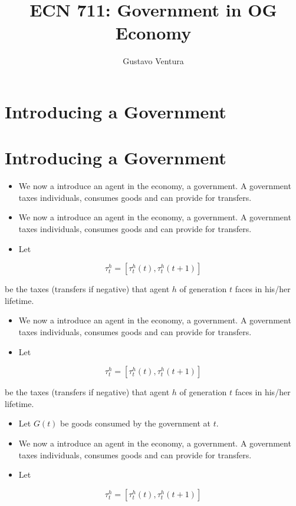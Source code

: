 \documentclass[10pt]{article}
\title{ECN 711: Government in OG Economy }
\author{Gustavo Ventura}
\date{}
\begin{document}
\maketitle


\section*{Introducing a Government}
\section*{Introducing a Government}
\begin{itemize}
  \item We now a introduce an agent in the economy, a government. A government taxes individuals, consumes goods and can provide for transfers.
  \item We now a introduce an agent in the economy, a government. A government taxes individuals, consumes goods and can provide for transfers.
  \item Let
\end{itemize}

$$
\tau_{t}^{h}=\left[\tau_{t}^{h}(t), \tau_{t}^{h}(t+1)\right]
$$

be the taxes (transfers if negative) that agent $h$ of generation $t$ faces in his/her lifetime.

\begin{itemize}
  \item We now a introduce an agent in the economy, a government. A government taxes individuals, consumes goods and can provide for transfers.
  \item Let
\end{itemize}

$$
\tau_{t}^{h}=\left[\tau_{t}^{h}(t), \tau_{t}^{h}(t+1)\right]
$$

be the taxes (transfers if negative) that agent $h$ of generation $t$ faces in his/her lifetime.

\begin{itemize}
  \item Let $G(t)$ be goods consumed by the government at $t$.
  \item We now a introduce an agent in the economy, a government. A government taxes individuals, consumes goods and can provide for transfers.
  \item Let
\end{itemize}

$$
\tau_{t}^{h}=\left[\tau_{t}^{h}(t), \tau_{t}^{h}(t+1)\right]
$$
\end{document}
